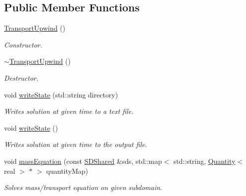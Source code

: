 \subsection*{Public Member Functions}
\begin{DoxyCompactItemize}
\item 
\mbox{\label{classTransportUpwind_add9a1d8fbb788ea5612d93634c79a8b9}} 
\hyperlink{classTransportUpwind_add9a1d8fbb788ea5612d93634c79a8b9}{Transport\+Upwind} ()
\begin{DoxyCompactList}\small\item\em Constructor. \end{DoxyCompactList}\item 
\mbox{\label{classTransportUpwind_a05c9e8da697dfc51a2b8c3cfd19c2545}} 
\hyperlink{classTransportUpwind_a05c9e8da697dfc51a2b8c3cfd19c2545}{$\sim$\+Transport\+Upwind} ()
\begin{DoxyCompactList}\small\item\em Destructor. \end{DoxyCompactList}\item 
void \hyperlink{classTransportUpwind_a6eb3dea8ecfa8441e56b0c0f8f787377}{write\+State} (std\+::string directory)
\begin{DoxyCompactList}\small\item\em Writes solution at given time to a text file. \end{DoxyCompactList}\item 
void \hyperlink{classTransportUpwind_aad7f9cd10acf49402a6a4fe039669a34}{write\+State} ()
\begin{DoxyCompactList}\small\item\em Writes solution at given time to the output file. \end{DoxyCompactList}\item 
void \hyperlink{classTransportUpwind_a1a59087c829238f58f028a544269be54}{mass\+Equation} (const \hyperlink{classSDShared}{S\+D\+Shared} \&sds, std\+::map$<$ std\+::string, \hyperlink{classQuantity}{Quantity}$<$ real $>$ $\ast$ $>$ quantity\+Map)
\begin{DoxyCompactList}\small\item\em Solves mass/transport equation on given subdomain. \end{DoxyCompactList}\item 
\mbox{\label{classTransportUpwind_add9a1d8fbb788ea5612d93634c79a8b9}} 

\end{DoxyCompactItemize}
